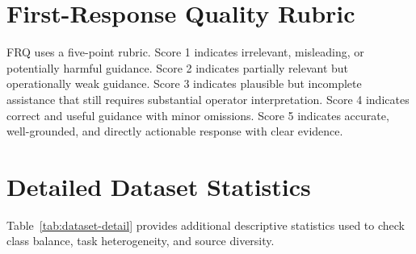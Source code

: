 \documentclass[conference]{IEEEtran}
\begin{document}
\appendices
\section{First-Response Quality Rubric}
\label{app:frq}
FRQ uses a five-point rubric. Score 1 indicates irrelevant, misleading, or potentially harmful guidance. Score 2 indicates partially relevant but operationally weak guidance. Score 3 indicates plausible but incomplete assistance that still requires substantial operator interpretation. Score 4 indicates correct and useful guidance with minor omissions. Score 5 indicates accurate, well-grounded, and directly actionable response with clear evidence.

\section{Detailed Dataset Statistics}
\label{app:data-detail}
Table~\ref{tab:dataset-detail} provides additional descriptive statistics used to check class balance, task heterogeneity, and source diversity.
\end{document}
